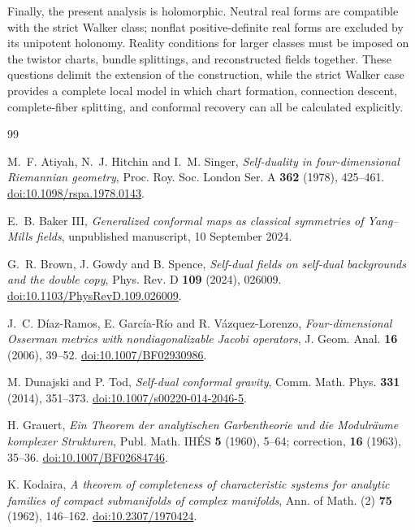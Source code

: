 \documentclass[11pt]{article}
\numberwithin{equation}{section}
\theoremstyle{definition}
\theoremstyle{remark}
\begin{document}
Finally, the present analysis is holomorphic. Neutral real forms are compatible with the strict Walker class; nonflat positive-definite real forms are excluded by its unipotent holonomy. Reality conditions for larger classes must be imposed on the twistor charts, bundle splittings, and reconstructed fields together. These questions delimit the extension of the construction, while the strict Walker case provides a complete local model in which chart formation, connection descent, complete-fiber splitting, and conformal recovery can all be calculated explicitly.

\begin{thebibliography}{99}
\raggedright

M.~F. Atiyah, N.~J. Hitchin and I.~M. Singer,
\emph{Self-duality in four-dimensional Riemannian geometry},
Proc. Roy. Soc. London Ser. A \textbf{362} (1978), 425--461.
\href{https://doi.org/10.1098/rspa.1978.0143}{doi:10.1098/rspa.1978.0143}.

E.~B. Baker III,
\emph{Generalized conformal maps as classical symmetries of Yang--Mills fields},
unpublished manuscript, 10 September 2024.

G.~R. Brown, J. Gowdy and B. Spence,
\emph{Self-dual fields on self-dual backgrounds and the double copy},
Phys. Rev. D \textbf{109} (2024), 026009.
\href{https://doi.org/10.1103/PhysRevD.109.026009}{doi:10.1103/PhysRevD.109.026009}.

J.~C. D\'iaz-Ramos, E. Garc\'ia-R\'io and R. V\'azquez-Lorenzo,
\emph{Four-dimensional Osserman metrics with nondiagonalizable Jacobi operators},
J. Geom. Anal. \textbf{16} (2006), 39--52.
\href{https://doi.org/10.1007/BF02930986}{doi:10.1007/BF02930986}.

M. Dunajski and P. Tod,
\emph{Self-dual conformal gravity},
Comm. Math. Phys. \textbf{331} (2014), 351--373.
\href{https://doi.org/10.1007/s00220-014-2046-5}{doi:10.1007/s00220-014-2046-5}.

H. Grauert,
\emph{Ein Theorem der analytischen Garbentheorie und die Modulr\"aume komplexer Strukturen},
Publ. Math. IH\'ES \textbf{5} (1960), 5--64; correction, \textbf{16} (1963), 35--36.
\href{https://doi.org/10.1007/BF02684746}{doi:10.1007/BF02684746}.

K. Kodaira,
\emph{A theorem of completeness of characteristic systems for analytic families of compact submanifolds of complex manifolds},
Ann. of Math. (2) \textbf{75} (1962), 146--162.
\href{https://doi.org/10.2307/1970424}{doi:10.2307/1970424}.


\end{thebibliography}
\end{document}
